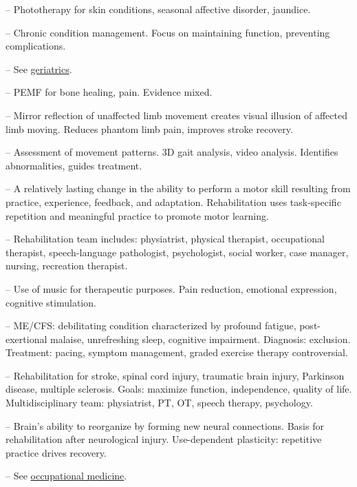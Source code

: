 -- Phototherapy for skin conditions, seasonal affective disorder, jaundice.

-- Chronic condition management. Focus on maintaining function, preventing complications.

-- See \hyperlink{Geriatrics}{geriatrics}.

-- PEMF for bone healing, pain. Evidence mixed.


-- Mirror reflection of unaffected limb movement creates visual illusion of affected limb moving. Reduces phantom limb pain, improves stroke recovery.

-- Assessment of movement patterns. 3D gait analysis, video analysis. Identifies abnormalities, guides treatment.

-- A relatively lasting change in the ability to perform a motor skill resulting from practice, experience, feedback, and adaptation. Rehabilitation uses task-specific repetition and meaningful practice to promote motor learning.

-- Rehabilitation team includes: physiatrist, physical therapist, occupational therapist, speech-language pathologist, psychologist, social worker, case manager, nursing, recreation therapist.

-- Use of music for therapeutic purposes. Pain reduction, emotional expression, cognitive stimulation.

-- ME/CFS: debilitating condition characterized by profound fatigue, post-exertional malaise, unrefreshing sleep, cognitive impairment. Diagnosis: exclusion. Treatment: pacing, symptom management, graded exercise therapy controversial.

-- Rehabilitation for stroke, spinal cord injury, traumatic brain injury, Parkinson disease, multiple sclerosis. Goals: maximize function, independence, quality of life. Multidisciplinary team: physiatrist, PT, OT, speech therapy, psychology.

-- Brain's ability to reorganize by forming new neural connections. Basis for rehabilitation after neurological injury. Use-dependent plasticity: repetitive practice drives recovery.

-- See \hyperlink{Occupational Medicine}{occupational medicine}.

